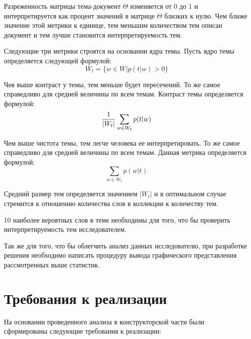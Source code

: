 Разреженность матрицы тема-документ $\Theta$ изменяется от 0 до 1 и интерпретируется как процент значений в матрице $\Theta$ близких к нулю. Чем ближе значение этой метрики к единице, тем меньшим количеством тем описан документ и тем лучше становится интерпретируемость тем.

Следующие три метрики строятся на основании ядра темы. Пусть ядро темы определяется следующей формулой:
$$
W_t = \{
    w \in W|p(t|w) > 0
\}
$$

Чев выше контраст у темы, тем меньше будет пересечений. То же самое справедливо для средней величины по всем темам. Контраст темы определяется формулой:
$$
{{1}\over{|W_t|}}\sum_{w \in W_t}{
    p(t|w)
}
$$

Чем выше чистота темы, тем легче человека ее интерпретировать. То же самое справедливо для средней величины по всем темам. Данная метрика определяется формулой:
$$
\sum_{w \in W_t}{
    p(w|t)
}
$$

Средний размер тем определяется значением $|W_t|$ и в оптимальном случае стремится к отношению количества слов в коллекции к количеству тем.

10 наиболее вероятных слов в теме необходимы для того, что бы проверить интерпретируемость тем исследователем.

Так же для того, что бы облегчить анализ данных исследователю, при разработке решения необходимо написать процедуру вывода графического представления рассмотренных выше статистик.

%
\section{Требования к реализации}

На основании проведенного анализа в конструкторской части были сформированы следующие требования к реализации:

